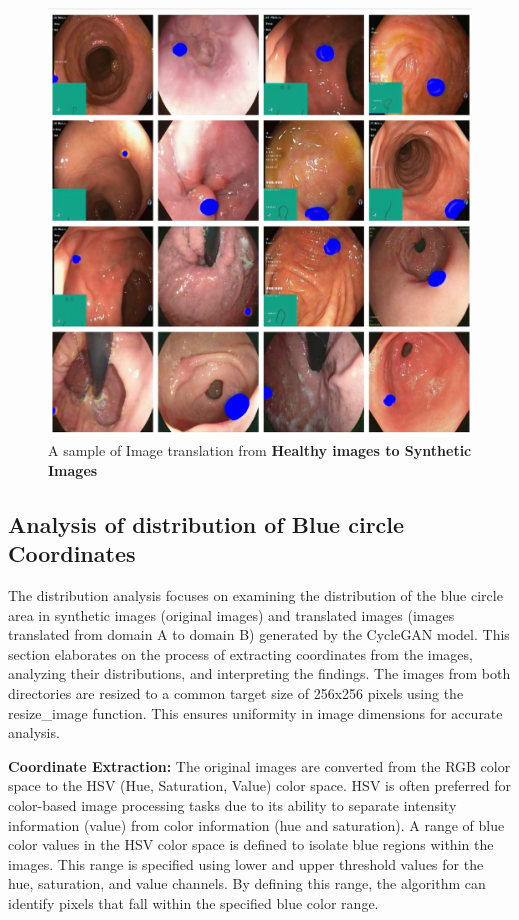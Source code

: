 \documentclass[UKenglish,12pt]{master-style}
\begin{document}
\begin{figure}[htbp]
    \centering
    \includegraphics[width=1\textwidth]{Images/Output_A_B.jpeg}
    \caption{A sample of Image translation from \textbf{Healthy images to Synthetic Images}}
    \label{fig:Output_A_B}
\end{figure}


\subsection{Analysis of distribution of Blue circle Coordinates}

The distribution analysis focuses on examining the distribution of the blue circle area in synthetic images (original images) and translated images (images translated from domain A to domain B) generated by the CycleGAN model. This section elaborates on the process of extracting coordinates from the images, analyzing their distributions, and interpreting the findings. The images from both directories are resized to a common target size of 256x256 pixels using the resize\_image function. This ensures uniformity in image dimensions for accurate analysis.

\textbf{Coordinate Extraction: }The original images are converted from the RGB color space to the HSV (Hue, Saturation, Value) color space. HSV is often preferred for color-based image processing tasks due to its ability to separate intensity information (value) from color information (hue and saturation). A range of blue color values in the HSV color space is defined to isolate blue regions within the images. This range is specified using lower and upper threshold values for the hue, saturation, and value channels. By defining this range, the algorithm can identify pixels that fall within the specified blue color range.
\end{document}
